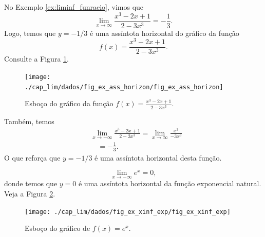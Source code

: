 \begin{ex}\label{ex:ass_hor}
  No Exemplo \ref{ex:liminf_funracio}, vimos que
  \begin{equation}
    \lim_{x\to\infty} \frac{x^3 - 2x + 1}{2 - 3x^3} = -\frac{1}{3}.
  \end{equation}
  Logo, temos que $y=-1/3$ é uma assíntota horizontal do gráfico da função
  \begin{equation}
    f(x) = \frac{x^3 - 2x + 1}{2 - 3x^3}.
  \end{equation}
  Consulte a Figura \ref{fig:ex_ass_horizon}.

      \begin{figure}[H]
      \centering
      \texttt{[image: ./cap\_lim/dados/fig\_ex\_ass\_horizon/fig\_ex\_ass\_horizon]}
      \caption{Esboço do gráfico da função $\displaystyle f(x) = \frac{x^3 - 2x + 1}{2 - 3x^3}$.}
      \label{fig:ex_ass_horizon}
    \end{figure}

  Também, temos
  \begin{align}
    & \lim_{x\to -\infty} \frac{x^3 - 2x + 1}{2 - 3x^3} = \lim_{x\to\infty} \frac{x^3}{-3x^3} \\
    & \text{}\quad = -\frac{1}{3}.
  \end{align}
  O que reforça que $y = -1/3$ é uma assíntota horizontal desta função.
\end{ex}

\begin{ex}\label{ex:lim_exp_x-inf}
  \begin{equation}
    \lim_{x\to -\infty} e^x = 0,
  \end{equation}
  donde temos que $y=0$ é uma assíntota horizontal da função exponencial natural. Veja a Figura \ref{fig:lim_ex_xinf_exp}.

  \begin{figure}[H]
    \centering
    \texttt{[image: ./cap\_lim/dados/fig\_ex\_xinf\_exp/fig\_ex\_xinf\_exp]}
    \caption{Esboço do gráfico de $f(x)=e^x$.}
    \label{fig:lim_ex_xinf_exp}
  \end{figure}
\end{ex}


